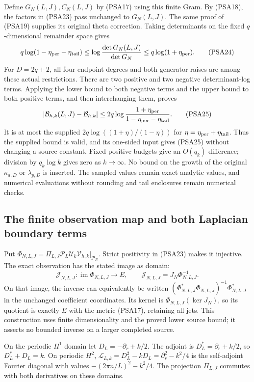Define $G_N(L,J),C_N(L,J)$ by (PSA17) using this finite Gram.
By (PSA18), the factors in (PSA23) pass unchanged to $G_N(L,J)$.
The same proof of (PSA19) supplies its original theta correction.
Taking determinants on the fixed $q$-dimensional remainder space gives
\[
 q\log(1-\eta_{\rm per}-\eta_{\rm tail})
 \le\log\frac{\det G_N(L,J)}{\det G_N}
 \le q\log(1+\eta_{\rm per}).
 \tag{PSA24}
\]
For $D=2q+2$, all four endpoint degrees and both generator raises
are among these actual restrictions. There are two positive and two
negative determinant-log terms. Applying the lower bound to both
negative terms and the upper bound to both positive terms, and then
interchanging them, proves
\[
 \left|\mathcal B_{h,k}(L,J)-\mathcal B_{h,k}\right|
 \le2q\log\frac{1+\eta_{\rm per}}
                         {1-\eta_{\rm per}-\eta_{\rm tail}}.
 \tag{PSA25}
\]
It is at most the supplied
$2q\log((1+\eta)/(1-\eta))$ for
$\eta=\eta_{\rm per}+\eta_{\rm tail}$. Thus the supplied bound is
valid, and its one-sided input gives (PSA25) without changing a source
constant. Fixed positive budgets give an $O(q_k)$ difference; division
by $q_k\log k$ gives zero as $k\to\infty$. No bound on the growth of
the original $\kappa_{a,D}$ or $\lambda_{p,D}$ is inserted. The
sampled values remain exact analytic values, and numerical evaluations
without rounding and tail enclosures remain numerical checks.

\subsection{The finite observation map and both Laplacian boundary terms}

Put $\Phi_{N,L,J}=\Pi_{L,J}\mathcal P_L\mathcal U_k
\mathcal V_{h,k}|_{\mathcal P_N}$. Strict positivity in (PSA23)
makes it injective. The exact observation has the stated image as
domain:
\[
 \mathcal J_{N,L,J}:\operatorname{im}\Phi_{N,L,J}\longrightarrow E,
 \qquad
 \mathcal J_{N,L,J}=J_N\Phi_{N,L,J}^{-1}.
 \tag{PSA26}
\]
On that image, the inverse can equivalently be written
$(\Phi_{N,L,J}^*\Phi_{N,L,J})^{-1}\Phi_{N,L,J}^*$ in the unchanged
coefficient coordinates. Its kernel is
$\Phi_{N,L,J}(\ker J_N)$, so its quotient is exactly $E$ with the
metric (PSA17), retaining all jets. This construction uses finite
dimensionality and the proved lower source bound; it asserts no
bounded inverse on a larger completed source.

On the periodic $H^1$ domain let $D_L=-\partial_r+k/2$.
The adjoint is $D_L^*=\partial_r+k/2$, so $D_L^*+D_L=k$.
On periodic $H^2$, $\mathscr L_{L,k}=D_L^2-kD_L
=\partial_r^2-k^2/4$ is the self-adjoint Fourier diagonal with
values $-(2\pi n/L)^2-k^2/4$. The projection $\Pi_{L,J}$ commutes
with both derivatives on these domains.

